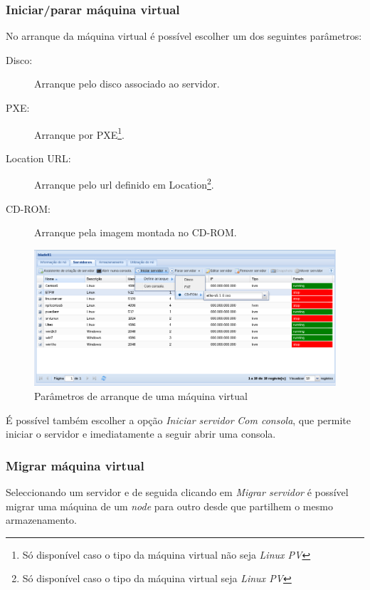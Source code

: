 \subsubsection{Iniciar/parar máquina virtual}
\label{sec:start_server}

No arranque da máquina virtual é possível escolher um dos seguintes parâmetros:
\begin{description}
	\item[Disco:] Arranque pelo disco associado ao servidor.
    \item[PXE:] Arranque por PXE\footnote{Só disponível caso o tipo da máquina virtual não seja \emph{Linux PV}\label{foot:notpv}}.
    \item[Location URL:] Arranque pelo url definido em Location\footnote{Só disponível caso o tipo da máquina virtual seja \emph{Linux PV}}.
	\item[CD-ROM:] Arranque pela imagem montada no CD-ROM.
    	 
\end{description}

\begin{figure}[H]
	\begin{center}
	\includegraphics[scale=0.45]{screenshots/server_start.png}
	\caption{Parâmetros de arranque de uma máquina virtual}
	\label{fig:server_start}
	\end{center}
\end{figure}

É possível também escolher a opção \emph{Iniciar servidor} \emph{Com consola}, que permite iniciar o servidor e imediatamente a seguir abrir uma consola.

\subsubsection{Migrar máquina virtual}
\label{sec:migrate_server}

Seleccionando um servidor e de seguida clicando em \emph{Migrar servidor} é possível migrar uma máquina de um \emph{node} para outro desde que partilhem o mesmo armazenamento.

